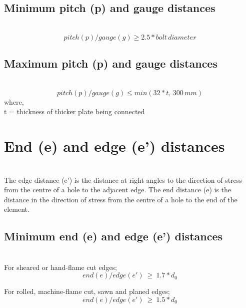\documentclass[11.5pt,a4paper,oneside]{report}
\begin{document}
\begin{Form}
\subsection{Minimum pitch (p) and gauge distances}
	\qquad \qquad [Reference: Cl. 10.2.2, IS 800 : 2007]\\
		\begin{equation}
			 pitch (p)/gauge (g) \ge 2.5 * bolt\, diameter
		\end{equation}
				
\subsection{Maximum pitch (p) and gauge distances}
\qquad \qquad [Reference: Cl. 10.2.3, IS 800 : 2007]\\				
		\begin{equation}
			pitch (p)/gauge (g) \leq min(32 * t,\, 300\, mm)
		\end{equation}
		where, \\
			\indent t = thickness of thicker plate being connected 

\section{End (e) and edge (e') distances}
				
\qquad {} \\
 
The edge distance (e') is the distance at right angles to the direction of stress from the centre of a hole to the adjacent edge. The end distance (e) is the distance in the direction of stress from the centre of a hole to the end of the element.

\subsection{Minimum end (e) and edge (e') distances}
\qquad \qquad [Reference: Cl. 10.2.4.2, IS 800 : 2007]\\

For sheared or hand-flame cut edges;
	\begin{equation}
		{end (e)/edge (e')} ~ \geq ~ 1.7 * d_0
	\end{equation}

For rolled, machine-flame cut, sawn and planed edges;
	\begin{equation}
		{end (e)/edge (e')} ~ \geq ~ 1.5 * d_0
	\end{equation}
	

\end{Form}
\end{document}
